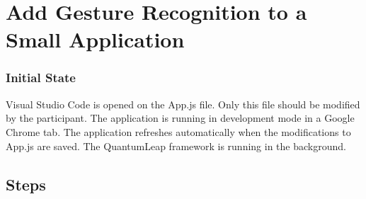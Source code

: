 \section{Add Gesture Recognition to a Small Application} \label{app:quantumleap-tasks:tasks-dev}
\subsubsection{Initial State}
Visual Studio Code is opened on the \textsf{App.js} file. Only this file should be modified by the participant. The application is running in development mode in a Google Chrome tab. The application refreshes automatically when the modifications to \textsf{App.js} are saved. The QuantumLeap framework is running in the background.

\subsection{Steps}
